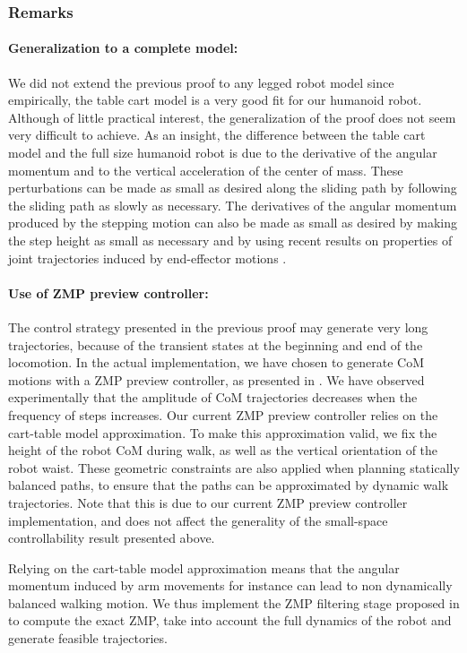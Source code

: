 \subsubsection{Remarks}
\paragraph{Generalization to a complete model:} 
We did not extend the previous proof to any legged robot model since
empirically, the table cart model is a very good fit for our humanoid
robot. Although of little practical interest, the generalization of
the proof does not seem very difficult to achieve. As an insight, the
difference between the table cart model and the full size humanoid
robot is due to the derivative of the angular momentum and to the
vertical acceleration of the center of mass. These perturbations can
be made as small as desired along the sliding path by following the
sliding path as slowly as necessary. The derivatives of the angular
momentum produced by the stepping motion can also be made as small as
desired by making the step height as small as necessary and by using
recent results on properties of joint trajectories induced by
end-effector motions \cite{Zanchettin6084763}.

\paragraph{Use of ZMP preview controller:}
The control strategy presented in the previous proof may generate very
long trajectories, because of the transient states at the beginning
and end of the locomotion. In the actual implementation, we have
chosen to generate CoM motions with a ZMP preview controller, as
presented in \cite{kaji03}.  We have observed experimentally that the
amplitude of CoM trajectories decreases when the frequency of steps
increases. Our current ZMP preview controller relies on the cart-table
model approximation.  To make this approximation valid, we fix the
height of the robot CoM during walk, as well as the vertical
orientation of the robot waist. These geometric constraints are also
applied when planning statically balanced paths, to ensure that the
paths can be approximated by dynamic walk trajectories. Note that this
is due to our current ZMP preview controller implementation, and does
not affect the generality of the small-space controllability result
presented above.

Relying on the cart-table model approximation means that the angular
momentum induced by arm movements for instance can lead to non
dynamically balanced walking motion. We thus implement the ZMP
filtering stage proposed in \cite{kaji03} to compute the exact ZMP,
take into account the full dynamics of the robot and generate feasible
trajectories.

